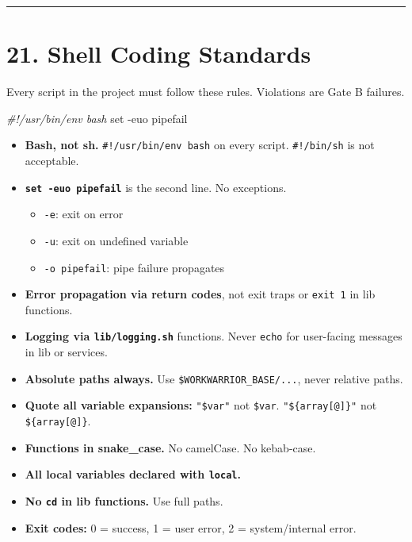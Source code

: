 \documentclass[
]{article}
\newenvironment{Shaded}{\begin{snugshade}}{\end{snugshade}}
\newcommand{\AttributeTok}[1]{\textcolor[rgb]{0.13,0.29,0.53}{#1}}
\newcommand{\BuiltInTok}[1]{#1}
\newcommand{\CommentTok}[1]{\textcolor[rgb]{0.56,0.35,0.01}{\textit{#1}}}
\newcommand{\NormalTok}[1]{#1}
\providecommand{\tightlist}{%
  \setlength{\itemsep}{0pt}\setlength{\parskip}{0pt}}
\begin{document}
\begin{center}\rule{0.5\linewidth}{0.5pt}\end{center}

\section{21. Shell Coding Standards}\label{shell-coding-standards}

Every script in the project must follow these rules. Violations are Gate
B failures.

\begin{Shaded}
\begin{Highlighting}[]
\CommentTok{\#!/usr/bin/env bash}
\BuiltInTok{set} \AttributeTok{{-}euo}\NormalTok{ pipefail}
\end{Highlighting}
\end{Shaded}

\begin{itemize}
\tightlist
\item
  \textbf{Bash, not sh.} \texttt{\#!/usr/bin/env\ bash} on every script.
  \texttt{\#!/bin/sh} is not acceptable.
\item
  \textbf{\texttt{set\ -euo\ pipefail}} is the second line. No
  exceptions.

  \begin{itemize}
  \tightlist
  \item
    \texttt{-e}: exit on error
  \item
    \texttt{-u}: exit on undefined variable
  \item
    \texttt{-o\ pipefail}: pipe failure propagates
  \end{itemize}
\item
  \textbf{Error propagation via return codes}, not exit traps or
  \texttt{exit\ 1} in lib functions.
\item
  \textbf{Logging via \texttt{lib/logging.sh}} functions. Never
  \texttt{echo} for user-facing messages in lib or services.
\item
  \textbf{Absolute paths always.} Use \texttt{\$WORKWARRIOR\_BASE/...},
  never relative paths.
\item
  \textbf{Quote all variable expansions:} \texttt{"\$var"} not
  \texttt{\$var}. \texttt{"\$\{array{[}@{]}\}"} not
  \texttt{\$\{array{[}@{]}\}}.
\item
  \textbf{Functions in snake\_case.} No camelCase. No kebab-case.
\item
  \textbf{All local variables declared with \texttt{local}.}
\item
  \textbf{No \texttt{cd} in lib functions.} Use full paths.
\item
  \textbf{Exit codes:} 0 = success, 1 = user error, 2 = system/internal
  error.
\end{itemize}
\end{document}
